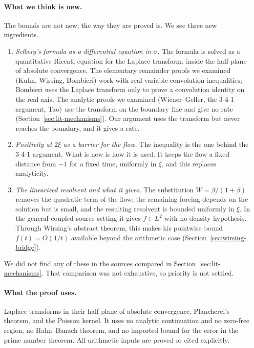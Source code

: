 \documentclass[11pt,letterpaper]{article}
\numberwithin{equation}{section}
\theoremstyle{definition}
\theoremstyle{remark}
\begin{document}
\paragraph{What we think is new.}
The bounds are not new; the way they are proved is. We see three new
ingredients.
\begin{enumerate}
 \item \emph{Selberg's formula as a differential equation in $\sigma$.}
       The formula is solved as a quantitative Riccati equation for the
       Laplace transform, inside the half-plane of absolute convergence.
       The elementary remainder proofs we examined (Kuhn, Wirsing, Bombieri)
       work with real-variable convolution inequalities; Bombieri uses the
       Laplace transform only to prove a convolution identity on the real
       axis. The analytic proofs we examined (Wiener--Geller, the 3-4-1
       argument, Tao) use the transform on the boundary line and give no
       rate (Section~\ref{sec:lit-mechanisms}). Our argument uses the transform but never reaches the
       boundary, and it gives a rate.
 \item \emph{Positivity at $2\xi$ as a barrier for the flow.} The
       inequality is the one behind the 3-4-1 argument. What is new is how
       it is used. It keeps the flow a fixed distance from $-1$ for a fixed
       time, uniformly in $\xi$, and this replaces analyticity.
 \item \emph{The linearized resolvent and what it gives.} The substitution
       $W=\beta/(1+\beta)$ removes the quadratic term of the flow; the
       remaining forcing depends on the solution but is small, and the
       resulting resolvent is bounded uniformly in $\xi$. In the general
       coupled-source setting it gives $f\in L^2$ with no density hypothesis. Through Wirsing's
       abstract theorem, this makes his pointwise bound $f(t)=O(1/t)$
       available beyond the arithmetic case (Section~\ref{sec:wirsing-bridge}).
\end{enumerate}
We did not find any of these in the sources compared in
Section~\ref{sec:lit-mechanisms}. That comparison was not exhaustive, so
priority is not settled.

\paragraph{What the proof uses.}
Laplace transforms in their half-plane of absolute convergence, Plancherel's
theorem, and the Poisson kernel. It uses no analytic continuation and no
zero-free region, no Hahn--Banach theorem, and no imported bound for the
error in the prime number theorem. All arithmetic inputs are proved or cited
explicitly.
\end{document}

